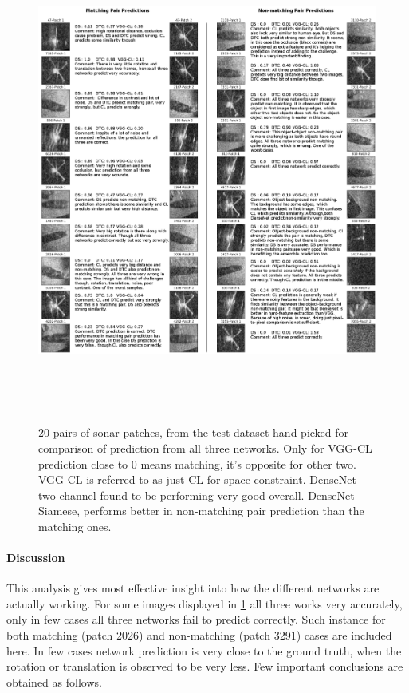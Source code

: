 \begin{figure}[htp]
\centering
\includegraphics[width=14cm,height=16cm]{images/densenet/real_prediction_images_grey}
\caption{20 pairs of sonar patches, from the test dataset hand-picked for comparison of prediction from all three networks. Only for VGG-CL prediction close to 0 means matching, it's opposite for other two. VGG-CL is referred to as just CL for 
space constraint. DenseNet two-channel found to be performing very good overall. 
DenseNet-Siamese, performs better in non-matching pair prediction than the matching ones.}
\label{fig:all_prediction_images}
\end{figure}

\paragraph{Discussion\\}
This analysis gives most effective insight into how the different networks are actually working. For some images displayed in \ref{fig:all_prediction_images} all three works very accurately, only in few cases all three networks fail to predict correctly. 
Such instance for both matching (patch 2026) and non-matching (patch 3291) cases are included here. In few cases network prediction is very close to the ground truth, when the rotation or translation is observed to be very less. Few important 
conclusions are obtained as follows.

